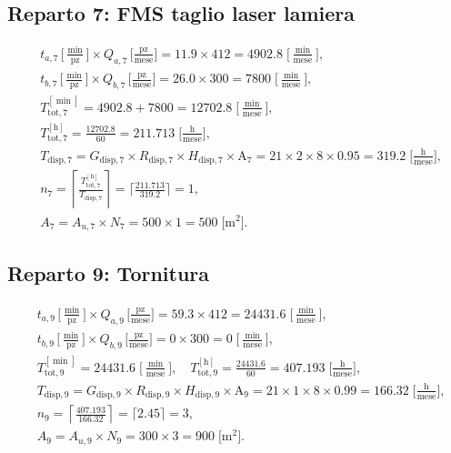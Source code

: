 \documentclass[a4paper,12pt]{article}
\begin{document}
\subsection{Reparto 7: FMS taglio laser lamiera}
{\small
\begin{align*}
 &t_{a,7}\,\bigl[\tfrac{\min}{\mathrm{pz}}\bigr]\times Q_{a,7}\,\bigl[\tfrac{\mathrm{pz}}{\mathrm{mese}}\bigr]
 =11.9\times412=4902.8\;\bigl[\tfrac{\min}{\mathrm{mese}}\bigr],\\
 &t_{b,7}\,\bigl[\tfrac{\min}{\mathrm{pz}}\bigr]\times Q_{b,7}\,\bigl[\tfrac{\mathrm{pz}}{\mathrm{mese}}\bigr]
 =26.0\times300=7800\;\bigl[\tfrac{\min}{\mathrm{mese}}\bigr],\\
 &T_{\mathrm{tot},7}^{[\min]}=4902.8+7800=12702.8\;\bigl[\tfrac{\min}{\mathrm{mese}}\bigr],\\
 &T_{\mathrm{tot},7}^{[\mathrm{h}]}=\frac{12702.8}{60}=211.713\;\bigl[\tfrac{\mathrm{h}}{\mathrm{mese}}\bigr],\\
 &T_{\mathrm{disp},7}
 =G_{\mathrm{disp},7}\times R_{\mathrm{disp},7}\times H_{\mathrm{disp},7}\times\text{A}_7
 =21\times2\times8\times0.95
 =319.2\;\bigl[\tfrac{\mathrm{h}}{\mathrm{mese}}\bigr],\\
 &n_{7}=\left\lceil\frac{T_{\mathrm{tot},7}^{[\mathrm{h}]}}{T_{\mathrm{disp},7}}\right\rceil
 =\bigl\lceil\tfrac{211.713}{319.2}\bigr\rceil=1,\\
 &A_{7}=A_{u,7}\times N_{7}=500\times1=500\;\bigl[\mathrm{m}^2\bigr].
\end{align*}
}

\subsection{Reparto 9: Tornitura}
{\small
\begin{align*}
 &t_{a,9}\,\bigl[\tfrac{\min}{\mathrm{pz}}\bigr]\times Q_{a,9}\,\bigl[\tfrac{\mathrm{pz}}{\mathrm{mese}}\bigr]
 =59.3\times412=24431.6\;\bigl[\tfrac{\min}{\mathrm{mese}}\bigr],\\
 &t_{b,9}\,\bigl[\tfrac{\min}{\mathrm{pz}}\bigr]\times Q_{b,9}\,\bigl[\tfrac{\mathrm{pz}}{\mathrm{mese}}\bigr]
 =0\times300=0\;\bigl[\tfrac{\min}{\mathrm{mese}}\bigr],\\
 &T_{\mathrm{tot},9}^{[\min]}=24431.6\;\bigl[\tfrac{\min}{\mathrm{mese}}\bigr],\quad
 T_{\mathrm{tot},9}^{[\mathrm{h}]}=\tfrac{24431.6}{60}=407.193\;\bigl[\tfrac{\mathrm{h}}{\mathrm{mese}}\bigr],\\
 &T_{\mathrm{disp},9}
 =G_{\mathrm{disp},9}\times R_{\mathrm{disp},9}\times H_{\mathrm{disp},9}\times\text{A}_9
 =21\times1\times8\times0.99
 =166.32\;\bigl[\tfrac{\mathrm{h}}{\mathrm{mese}}\bigr],\\
 &n_{9}=\left\lceil\frac{407.193}{166.32}\right\rceil
 =\bigl\lceil2.45\bigr\rceil=3,\\
 &A_{9}=A_{u,9}\times N_{9}=300\times3=900\;\bigl[\mathrm{m}^2\bigr].
\end{align*}
}
\end{document}
